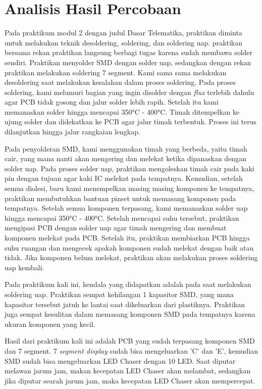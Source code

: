 \section*{Analisis Hasil Percobaan}

Pada praktikum modul 2 dengan judul Dasar Telematika, praktikan diminta untuk melakukan teknik desoldering, soldering, dan soldering uap. praktikan bersama rekan praktikan langsung berbagi tugas karena sudah membawa solder sendiri. Praktikan menyolder SMD dengan solder uap, sedangkan dengan rekan praktikan melakukan soldering 7 segment. Kami sama sama melakukan desoldering saat melakukan kesalahan dalam proses soldering. Pada proses soldering, kami melumuri bagian yang ingin disolder dengan \textit{flux} terlebih dahulu agar PCB tidak gosong dan jalur solder lebih rapih. Setelah itu kami memanaskan solder hingga mencapai 350°C - 400°C. Timah ditempelkan ke ujung solder dan didekatkan ke PCB agar jalur timah terbentuk. Proses ini terus dilanjutkan hingga jalur rangkaian lengkap.

Pada penyolderan SMD, kami menggunakan timah yang berbeda, yaitu timah cair, yang mana nanti akan mengering dan melekat ketika dipanaskan dengan solder uap. Pada proses solder uap, praktikan mengoleskan timah cair pada kaki pin dengan tujuan agar kaki IC melekat pada tempatnya. Kemudian, setelah semua diolesi, baru kami menempelkan masing masing komponen ke tempatnya, praktikan membutuhkan bantuan pinset untuk memasang komponen pada tempatnya. Setelah semua komponen terpasang, kami memanaskan solder uap hingga mencapai 350°C - 400°C. Setelah mencapai suhu tersebut, praktikan mengipasi PCB dengan solder uap agar timah mengering dan membuat komponen melekat pada PCB. Setelah itu, praktikan membiarkan PCB hingga suhu ruangan dan mengecek apakah komponen sudah melekat dengan baik atau tidak. Jika komponen belum melekat, praktikan akan melakukan proses soldering uap kembali.

Pada praktikum kali ini, kendala yang didapatkan adalah pada saat melakukan soldering uap. Praktikan sempat kehilangan 1 kapasitor SMD, yang mana kapasitor tersebut jatuh ke lantai saat dikeluarkan dari plastiknya. Praktikan juga sempat kesulitan dalam memasang komponen SMD pada tempatnya karena ukuran komponen yang kecil.

Hasil dari praktikum kali ini adalah PCB yang sudah terpasang komponen SMD dan 7 segment. 7 \textit{segment display} sudah bisa mengeluarkan 'C' dan 'E', kemudian SMD sudah bisa mengeluarkan LED Chaser dengan 10 LED. Saat diputar melawan jarum jam, makan kecepatan LED Chaser akan melambat, sedangkan jika diputar searah jarum jam, maka kecepatan LED Chaser akan mempercepat.

\newpage